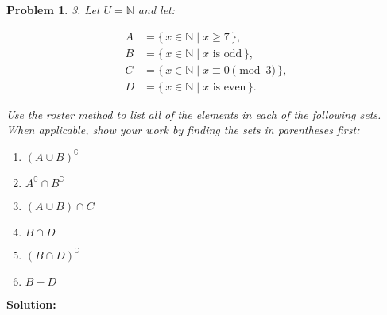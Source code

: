\documentclass[12pt]{article}
\newtheorem{problem}{Problem}
\theoremstyle{definition}
\begin{document}
\begin{problem}
3. Let $U = \mathbb{N}$ and let:

\begin{align*}
    A &= \{\, x \in \mathbb{N} \mid x \geq 7 \,\}, \\
    B &= \{\, x \in \mathbb{N} \mid x \text{ is odd} \,\}, \\
    C &= \{\, x \in \mathbb{N} \mid x \equiv 0 \pmod{3} \,\}, \\
    D &= \{\, x \in \mathbb{N} \mid x \text{ is even} \,\}.
\end{align*}

Use the roster method to list all of the elements in each of the following sets. When applicable, show your work by finding the sets in parentheses first:

\begin{enumerate}[label=(\alph*)]
    \item $(A \cup B)^\complement$
    \item $A^\complement \cap B^\complement$
    \item $(A \cup B) \cap C$
    \item $B \cap D$
    \item $(B \cap D)^\complement$
    \item $B - D$
\end{enumerate}
\end{problem}

\textbf{Solution:}
\end{document}
